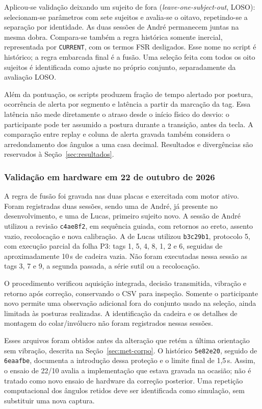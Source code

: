 Aplicou-se validação deixando um sujeito de fora
(\emph{leave-one-subject-out}, LOSO): selecionam-se parâmetros com
sete sujeitos e avalia-se o oitavo, repetindo-se a separação por
identidade. As duas sessões de André permanecem juntas na mesma
dobra. Compara-se também a regra histórica somente inercial,
representada por \texttt{CURRENT}, com os termos FSR desligados.
Esse nome no script é histórico; a regra embarcada final é a fusão.
Uma seleção feita com todos os oito sujeitos é identificada como
ajuste no próprio conjunto, separadamente da avaliação LOSO.

Além da pontuação, os scripts produzem fração de tempo alertado por
postura, ocorrência de alerta por segmento e latência a partir da
marcação da tag. Essa latência não mede diretamente o atraso desde o
início físico do desvio: o participante pode ter assumido a postura
durante a transição, antes da tecla. A comparação entre replay e
coluna de alerta gravada também considera o arredondamento dos
ângulos a uma casa decimal. Resultados e divergências são reservados
à Seção~\ref{sec:resultados}.

\subsubsection{Validação em hardware em 22 de outubro de 2026}

A regra de fusão foi gravada nas duas placas e exercitada com motor
ativo. Foram registradas duas sessões, sendo uma de André, já
presente no desenvolvimento, e uma de Lucas, primeiro sujeito novo.
A sessão de André utilizou a revisão \texttt{c4ae8f2}, em sequência
guiada, com retornos ao ereto, assento vazio, recolocação e nova
calibração. A de Lucas utilizou \texttt{b3c29b1}, protocolo 5,
com execução parcial da folha P3: tags 1, 5, 4, 8, 1, 2 e 6,
seguidas de aproximadamente 10\,s de cadeira vazia. Não foram
executadas nessa sessão as tags 3, 7 e 9, a segunda passada, a série
sutil ou a recolocação.

O procedimento verificou aquisição integrada, decisão transmitida,
vibração e retorno após correção, conservando o CSV para inspeção.
Somente o participante novo permite uma observação adicional fora
do conjunto usado na seleção, ainda limitada às posturas realizadas.
A identificação da cadeira e os detalhes de montagem do
colar/invólucro não foram registrados nessas sessões.

Esses arquivos foram obtidos antes da alteração que retém a última
orientação sem vibração, descrita na Seção~\ref{sec:met-corpo}.
O histórico \texttt{5e82e20}, seguido de \texttt{6eaafbe}, documenta
a introdução dessa proteção e o limite final de 1{,}5\,s.
Assim, o ensaio de 22/10 avalia a implementação que estava gravada
na ocasião; não é tratado como novo ensaio de hardware da correção
posterior. Uma repetição computacional dos ângulos retidos deve ser
identificada como simulação, sem substituir uma nova captura.

